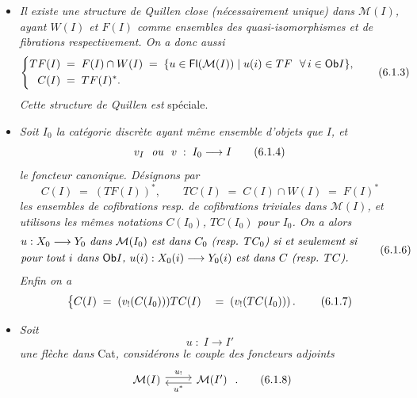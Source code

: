 \begin{itemize}[leftmargin=2.5em]
\item[a)] \textit{Il existe une structure de Quillen close (nécessairement unique) dans $\mathcal{M}(I)$, ayant $W(I)$ et $F(I)$ comme ensembles des quasi-isomorphismes et de fibrations respectivement. On a donc aussi}
\[
\left\{
\begin{aligned}
TF(I) \;&=\; F(I)\cap W(I) \;=\; \{u\in \Fl(\mathcal{M}(I)) \mid u(i)\in TF \ \ \forall\, i\in \Ob I\},\\
C(I) \;&=\; TF(I)^{*}.
\end{aligned}
\right.
\tag*{(6.1.3)}
\]
\textit{Cette structure de Quillen est} spéciale.

\item[b)] \textit{Soit $I_0$ la catégorie discrète ayant même ensemble d'objets que $I$, et}
\[
v_I \ \ \text{\textit{ou}}\ \ v \;:\; I_0 \longrightarrow I
\tag*{(6.1.4)}
\]
\textit{le foncteur canonique. Désignons par}
\[
C(I) \;=\; (TF(I))^{*}, \qquad TC(I) \;=\; C(I)\cap W(I) \;=\; F(I)^{*}
\tag*{(6.1.5)}
\]
\textit{les ensembles de cofibrations resp. de cofibrations triviales dans $\mathcal{M}(I)$, et utilisons les mêmes notations $C(I_0)$, $TC(I_0)$ pour $I_0$. On a alors}
\[
\begin{aligned}
&\text{\textit{$u : X_0 \longrightarrow Y_0$ dans $\mathcal{M}(I_0)$ est dans $C_0$ (resp. $TC_0$) si et seulement si}}\\
&\text{\textit{pour tout $i$ dans $\Ob I$, $u(i) : X_0(i) \longrightarrow Y_0(i)$ est dans $C$ (resp. $TC$).}}
\end{aligned}
\tag*{(6.1.6)}
\]
\textit{Enfin on a}
\[
\left\{
\begin{aligned}
C(I) \;&=\; (v_!(C(I_0)))\tl\\
TC(I) \;&=\; (v_!(TC(I_0)))\tl\,.
\end{aligned}
\right.
\tag*{(6.1.7)} %
\]

\item[c)] \textit{Soit}
\[
u \;:\; I \longrightarrow I'
\]
\textit{une flèche dans} Cat\textit{, considérons le couple des foncteurs adjoints}
\[
\begin{tikzcd}
\mathcal{M}(I) \arrow[r, shift left, "u_!"] & \mathcal{M}(I') \arrow[l, shift left, "u^{*}"]
\end{tikzcd}
\;.
\tag*{(6.1.8)}
\]



\end{itemize}
